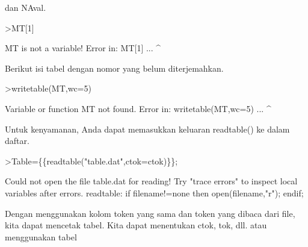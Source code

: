 \documentclass[a4paper,10pt]{article}
\begin{document}
\begin{eulernotebook}
\begin{eulercomment}
\begin{eulercomment}
\begin{eulercomment}
\begin{eulercomment}
\begin{eulercomment}
\begin{eulercomment}
\begin{eulercomment}
\begin{eulercomment}
\begin{eulercomment}
\begin{eulercomment}
\begin{eulercomment}
\begin{eulercomment}
\begin{eulercomment}
\begin{eulercomment}
\begin{eulercomment}
\begin{eulercomment}
\begin{eulercomment}
\begin{eulercomment}
\begin{eulercomment}
\begin{eulercomment}
\begin{eulercomment}
\begin{eulercomment}
\begin{eulercomment}
\begin{eulercomment}
\begin{eulercomment}
\begin{eulercomment}
\begin{eulercomment}
\begin{eulercomment}
\begin{eulercomment}
\begin{eulercomment}
\begin{eulercomment}
\begin{eulercomment}
\begin{eulercomment}
\begin{eulercomment}
\begin{eulercomment}
\begin{eulercomment}
\begin{eulercomment}
\begin{eulercomment}
\begin{eulercomment}
\begin{eulercomment}
\begin{eulercomment}
\begin{eulercomment}
\begin{eulercomment}
\begin{eulercomment}
\begin{eulercomment}
\begin{eulercomment}
\begin{eulercomment}
\begin{eulercomment}
\begin{eulercomment}
\begin{eulercomment}
\begin{eulercomment}
\begin{eulercomment}
\begin{eulercomment}
\begin{eulercomment}
\begin{eulercomment}
\begin{eulercomment}
\begin{eulercomment}
\begin{eulercomment}
\begin{eulercomment}
\begin{eulercomment}
\begin{eulercomment}
\begin{eulercomment}
\begin{eulercomment}
\begin{eulercomment}
\begin{eulercomment}
\begin{eulercomment}
\begin{eulercomment}
dan NAval.
\end{eulercomment}
\begin{eulerprompt}
>MT[1]
\end{eulerprompt}
\begin{euleroutput}
  MT is not a variable!
  Error in:
  MT[1] ...
       ^
\end{euleroutput}
\begin{eulercomment}
Berikut isi tabel dengan nomor yang belum diterjemahkan.
\end{eulercomment}
\begin{eulerprompt}
>writetable(MT,wc=5)
\end{eulerprompt}
\begin{euleroutput}
  Variable or function MT not found.
  Error in:
  writetable(MT,wc=5) ...
               ^
\end{euleroutput}
\begin{eulercomment}
Untuk kenyamanan, Anda dapat memasukkan keluaran readtable() ke dalam
daftar.
\end{eulercomment}
\begin{eulerprompt}
>Table=\{\{readtable("table.dat",ctok=ctok)\}\};
\end{eulerprompt}
\begin{euleroutput}
  Could not open the file
  table.dat
  for reading!
  Try "trace errors" to inspect local variables after errors.
  readtable:
      if filename!=none then open(filename,"r"); endif;
\end{euleroutput}
\begin{eulercomment}
Dengan menggunakan kolom token yang sama dan token yang dibaca dari
file, kita dapat mencetak tabel. Kita dapat menentukan ctok, tok, dll.
atau menggunakan tabel 
\end{eulercomment}
\end{eulercomment}
\end{eulercomment}
\end{eulercomment}
\end{eulercomment}
\end{eulercomment}
\end{eulercomment}
\end{eulercomment}
\end{eulercomment}
\end{eulercomment}
\end{eulercomment}
\end{eulercomment}
\end{eulercomment}
\end{eulercomment}
\end{eulercomment}
\end{eulercomment}
\end{eulercomment}
\end{eulercomment}
\end{eulercomment}
\end{eulercomment}
\end{eulercomment}
\end{eulercomment}
\end{eulercomment}
\end{eulercomment}
\end{eulercomment}
\end{eulercomment}
\end{eulercomment}
\end{eulercomment}
\end{eulercomment}
\end{eulercomment}
\end{eulercomment}
\end{eulercomment}
\end{eulercomment}
\end{eulercomment}
\end{eulercomment}
\end{eulercomment}
\end{eulercomment}
\end{eulercomment}
\end{eulercomment}
\end{eulercomment}
\end{eulercomment}
\end{eulercomment}
\end{eulercomment}
\end{eulercomment}
\end{eulercomment}
\end{eulercomment}
\end{eulercomment}
\end{eulercomment}
\end{eulercomment}
\end{eulercomment}
\end{eulercomment}
\end{eulercomment}
\end{eulercomment}
\end{eulercomment}
\end{eulercomment}
\end{eulercomment}
\end{eulercomment}
\end{eulercomment}
\end{eulercomment}
\end{eulercomment}
\end{eulercomment}
\end{eulercomment}
\end{eulercomment}
\end{eulercomment}
\end{eulercomment}
\end{eulercomment}
\end{eulercomment}
\end{eulernotebook}
\end{document}

